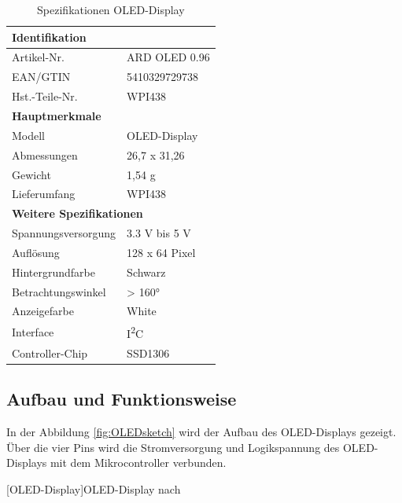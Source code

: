 \begin{longtable}[h]{|p{5cm}|p{8cm}|}
	\caption{Spezifikationen OLED-Display}
	\label{tab:specs_oled}\\
	\hline
	\multicolumn{2}{|l|}{\rule{0pt}{15pt}\textbf{Identifikation}} \\ \hline
	Artikel-Nr.& ARD OLED 0.96 \\ \hline
	EAN/GTIN & 5410329729738 \\ \hline
	Hst.-Teile-Nr. & WPI438 \\ \hline
	\multicolumn{2}{|l|}{\rule{0pt}{15pt}\textbf{Hauptmerkmale}} \\ \hline
	Modell & OLED-Display \\ \hline
	Abmessungen & 26,7 x 31,26 \\ \hline
	Gewicht & 1,54 g \\ \hline
	Lieferumfang & WPI438 \\ \hline
	
	\multicolumn{2}{|l|}{\rule{0pt}{15pt}\textbf{Weitere Spezifikationen}} \\ \hline
	Spannungsversorgung & 3.3 V bis 5 V \\ \hline
	Auflösung & 128 x 64 Pixel \\ \hline
	Hintergrundfarbe & Schwarz \\ \hline
	Betrachtungswinkel & > 160° \\ \hline
	Anzeigefarbe & White \\ \hline
	Interface & I\textsuperscript{2}C \\ \hline
	Controller-Chip & SSD1306 \\ \hline
	
\end{longtable}


\subsection{Aufbau und Funktionsweise}
In der Abbildung \ref{fig:OLEDsketch} wird der Aufbau des OLED-Displays gezeigt. Über die vier Pins wird die Stromversorgung und Logikspannung des OLED-Displays mit dem Mikrocontroller verbunden.

\begin{center}
	
	[OLED-Display]{OLED-Display nach}\label{fig:OLEDsketch}
	\cite{Velleman:WPI438}
	
\end{center}


